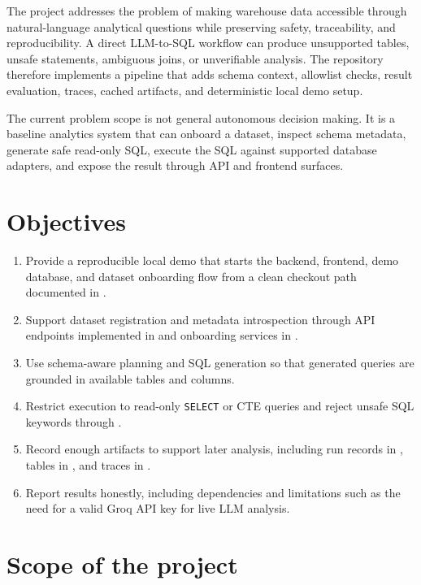 \documentclass[12pt,a4paper]{article}
\begin{document}
The project addresses the problem of making warehouse data accessible through natural-language analytical questions while preserving safety, traceability, and reproducibility. A direct LLM-to-SQL workflow can produce unsupported tables, unsafe statements, ambiguous joins, or unverifiable analysis. The repository therefore implements a pipeline that adds schema context, allowlist checks, result evaluation, traces, cached artifacts, and deterministic local demo setup.

The current problem scope is not general autonomous decision making. It is a baseline analytics system that can onboard a dataset, inspect schema metadata, generate safe read-only SQL, execute the SQL against supported database adapters, and expose the result through API and frontend surfaces.

\section{Objectives}

\begin{enumerate}
  \item Provide a reproducible local demo that starts the backend, frontend, demo database, and dataset onboarding flow from a clean checkout path documented in .
  \item Support dataset registration and metadata introspection through API endpoints implemented in  and onboarding services in .
  \item Use schema-aware planning and SQL generation so that generated queries are grounded in available tables and columns.
  \item Restrict execution to read-only \texttt{SELECT} or CTE queries and reject unsafe SQL keywords through .
  \item Record enough artifacts to support later analysis, including run records in , tables in , and traces in .
  \item Report results honestly, including dependencies and limitations such as the need for a valid Groq API key for live LLM analysis.
\end{enumerate}

\section{Scope of the project}
\end{document}
